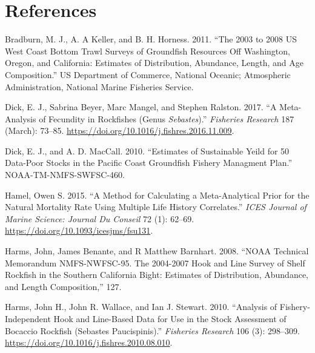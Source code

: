\documentclass[11pt,
  english,
  a4paper,
]{article}
\begin{document}
\leavevmode\tagmcend\tagstructend\par

\newpage

\clearpage


\hypertarget{references}{%
\section{References}\label{references}}

\leavevmode\tagmcend\tagstructend


\hypertarget{refs}{}
\begin{cslreferences}
\leavevmode\hypertarget{ref-bradburn_2003_2011}{}%
Bradburn, M. J., A. A Keller, and B. H. Horness. 2011. ``The 2003 to 2008 US West Coast Bottom Trawl Surveys of Groundfish Resources Off Washington, Oregon, and California: Estimates of Distribution, Abundance, Length, and Age Composition.'' US Department of Commerce, National Oceanic; Atmospheric Administration, National Marine Fisheries Service.

\leavevmode\hypertarget{ref-dick_meta-analysis_2017}{}%
Dick, E. J., Sabrina Beyer, Marc Mangel, and Stephen Ralston. 2017. ``A Meta-Analysis of Fecundity in Rockfishes (Genus \emph{Sebastes}).'' \emph{Fisheries Research} 187 (March): 73--85. \url{https://doi.org/10.1016/j.fishres.2016.11.009}.

\leavevmode\hypertarget{ref-dick_estimates_2010}{}%
Dick, E. J., and A. D. MacCall. 2010. ``Estimates of Sustainable Yeild for 50 Data-Poor Stocks in the Pacific Coast Groundfish Fishery Managment Plan.'' NOAA-TM-NMFS-SWFSC-460.

\leavevmode\hypertarget{ref-hamel_method_2015}{}%
Hamel, Owen S. 2015. ``A Method for Calculating a Meta-Analytical Prior for the Natural Mortality Rate Using Multiple Life History Correlates.'' \emph{ICES Journal of Marine Science: Journal Du Conseil} 72 (1): 62--69. \url{https://doi.org/10.1093/icesjms/fsu131}.

\leavevmode\hypertarget{ref-harms_noaa_2008}{}%
Harms, John, James Benante, and R Matthew Barnhart. 2008. ``NOAA Technical Memorandum NMFS-NWFSC-95. The 2004-2007 Hook and Line Survey of Shelf Rockfish in the Southern California Bight: Estimates of Distribution, Abundance, and Length Composition,'' 127.

\leavevmode\hypertarget{ref-harms_analysis_2010}{}%
Harms, John H., John R. Wallace, and Ian J. Stewart. 2010. ``Analysis of Fishery-Independent Hook and Line-Based Data for Use in the Stock Assessment of Bocaccio Rockfish (Sebastes Paucispinis).'' \emph{Fisheries Research} 106 (3): 298--309. \url{https://doi.org/10.1016/j.fishres.2010.08.010}.


\end{cslreferences}
\end{document}
